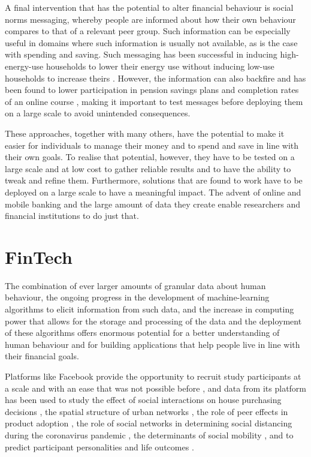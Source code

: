 A final intervention that has the potential to alter financial behaviour is
social norms messaging, whereby people are informed about how their own
behaviour compares to that of a relevant peer group. Such information can be
especially useful in domains where such information is usually not available,
as is the case with spending and saving. Such messaging has been successful in inducing high-energy-use households to lower their energy use without inducing low-use
households to increase theirs \citep{schultz2007constructive,
allcott2011social, allcott2014short, brandon2017effects}. However, the
information can also backfire and has been found to lower participation in
pension savings plans \citep{beshears2015effect} and completion rates of an
online course \citep{rogers2016discouraged}, making it important to test
messages before deploying them on a large scale to avoid unintended
consequences.

These approaches, together with many others, have the potential to make it
easier for individuals to manage their money and to spend and save in line with
their own goals. To realise that potential, however, they have to be tested on
a large scale and at low cost to gather reliable results and to have the
ability to tweak and refine them. Furthermore, solutions that are found to work
have to be deployed on a large scale to have a meaningful impact. The advent of
online and mobile banking and the large amount of data they create enable
researchers and financial institutions to do just that.


\section{FinTech}%

The combination of ever larger amounts of granular data about human behaviour, the ongoing progress in the development of machine-learning
algorithms to elicit information from such data, and the increase in computing power
that allows for the storage and processing of the data and the deployment of
these algorithms offers enormous potential for a better understanding of human
behaviour \citep{jaffe2014big, buyalskaya2021golden} and for building
applications that help people live in line with their financial goals.

Platforms like Facebook provide the opportunity to recruit study participants
at a scale and with an ease that was not possible before
\citep{kosinski2015facebook}, and data from its platform has been used to study the effect of social interactions on
house purchasing decisions \citep{bailey2018economic, bailey2019house}, the
spatial structure of urban networks \citep{bailey2020socialconnectedness}, the role of peer
effects in product adoption \citep{bailey2019peer}, the role of social networks
in determining social distancing during the coronavirus pandemic
\citep{bailey2020socialnetworks}, the determinants of social mobility
\citep{chetty2022sociali, chetty2022socialii}, and to predict participant personalities and life outcomes \citep{youyou2015computer}.

